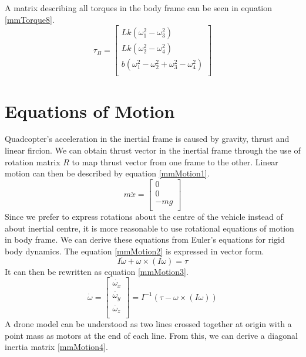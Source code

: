 A matrix describing all torques in the body frame can be seen in equation \ref{mmTorque8}.
\begin{equation}
\label{mmTorque8}
 	\tau _B = \begin{bmatrix}
 	Lk(\omega _1^2 - \omega _3^2)								\\
 	Lk(\omega _2^2 - \omega _4^2) 								\\
 	b(\omega _1^2 - \omega _2^2 + \omega _3^2 - \omega _4 ^2) 	\\ 
 	\end{bmatrix}	
\end{equation}

\section{Equations of Motion}
Quadcopter's acceleration in the inertial frame is caused by gravity, thrust and linear fircion. We can obtain thrust vector in the inertial frame through the use of rotation matrix $R$ to map thrust vector from one frame to the other.
Linear motion can then be described by equation \ref{mmMotion1}.
\begin{equation}
\label{mmMotion1}
 	m\ddot{x} = \begin{bmatrix}
 	0	\\
 	0	\\
 	-mg	\\ 
 	\end{bmatrix}	
\end{equation}
Since we prefer to express rotations about the centre of the vehicle instead of about inertial centre, it is more reasonable to use rotational equations of motion in body frame. We can derive these equations from Euler’s equations for rigid body dynamics. The equation \ref{mmMotion2} is expressed in vector form.
\begin{equation}
\label{mmMotion2}
	I\dot{\omega} + \omega \times (I\omega ) = \tau
\end{equation}
It can then be rewritten as equation \ref{mmMotion3}.
\begin{equation}
\label{mmMotion3}
 	\dot{\omega} = \begin{bmatrix}
 	\dot{\omega _x}	\\
 	\dot{\omega _y}	\\
 	\dot{\omega _z}	\\ 
 	\end{bmatrix} = I^{-1}(\tau - \omega \times (I\omega ))
\end{equation}
A drone model can be understood as two lines crossed together at origin with a point mass as motors at the end of each line. From this, we can derive a diagonal inertia matrix \ref{mmMotion4}.
